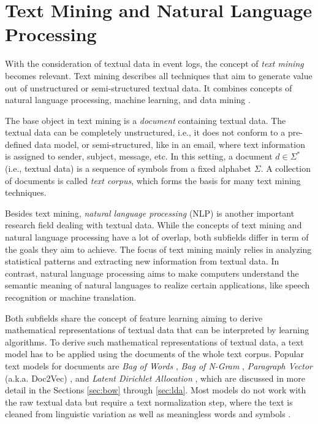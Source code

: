 \section{Text Mining and Natural Language Processing}

With the consideration of textual data in event logs, the concept of \textit{text mining} becomes relevant.
Text mining describes all techniques that aim to generate value out of unstructured or semi-structured textual data.
It combines concepts of natural language processing, machine learning, and data mining \cite{DBLP:books/daglib/0022577}.

The base object in text mining is a \textit{document} containing textual data.
The textual data can be completely unstructured, i.e., it does not conform to a pre-defined data model, or semi-structured, like in an email, where text information is assigned to sender, subject, message, etc.
In this setting, a document $d \in \Sigma^*$ (i.e., textual data) is a sequence of symbols from a fixed alphabet $\Sigma$.
A collection of documents is called \textit{text corpus}, which forms the basis for many text mining techniques.

Besides text mining, \textit{natural language processing} (NLP) is another important research field dealing with textual data.
While the concepts of text mining and natural language processing have a lot of overlap, both subfields differ in term of the goals they aim to achieve.
The focus of text mining mainly relies in analyzing statistical patterns and extracting new information from textual data.
In contrast, natural language processing aims to make computers understand the semantic meaning of natural languages to realize certain applications, like speech recognition or machine translation.

Both subfields share the concept of feature learning aiming to derive mathematical representations of textual data that can be interpreted by learning algorithms.
To derive such mathematical representations of textual data, a text model has to be applied using the documents of the whole text corpus.
Popular text models for documents are \textit{Bag of Words} \cite{harris1954distributional}, \textit{Bag of N-Gram} \cite{brown1992class}, \textit{Paragraph Vector} (a.k.a. Doc2Vec) \cite{DBLP:conf/icml/LeM14}, and \textit{Latent Dirichlet Allocation} \cite{DBLP:journals/jmlr/BleiNJ03}, which are discussed in more detail in the Sections \ref{sec:bow} through \ref{sec:lda}.
Most models do not work with the raw textual data but require a text normalization step, where the text is cleaned from linguistic variation as well as meaningless words and symbols \cite{DBLP:books/lib/JurafskyM09}.

